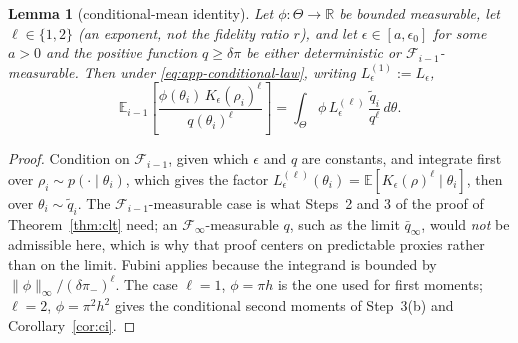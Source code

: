 \documentclass[pdflatex,sn-mathphys-num]{sn-jnl}
\theoremstyle{plain}
\newtheorem{lemma}[theorem]{Lemma}
\theoremstyle{definition}
\begin{document}
\begin{appendices}
\begin{lemma}[conditional-mean identity]\label{lem:condmean}
Let $\phi:\Theta\to\mathbb{R}$ be bounded measurable, let $\ell\in\{1,2\}$ (an exponent, not the fidelity ratio $r$), and let $\epsilon\in[a,\epsilon_0]$ for some $a>0$ and the positive function $q\ge\delta\pi$ be either deterministic or $\mathcal{F}_{i-1}$-measurable. Then under \eqref{eq:app-conditional-law}, writing $L^{(1)}_\epsilon:=L_\epsilon$,
\[
\mathbb{E}_{i-1}\!\left[\frac{\phi(\theta_i)\,K_\epsilon(\rho_i)^{\ell}}{q(\theta_i)^{\ell}}\right]
=\int_\Theta \phi\,L^{(\ell)}_\epsilon\,\frac{\tilde q_i}{q^{\ell}}\,d\theta .
\]
\end{lemma}
\begin{proof}
Condition on $\mathcal{F}_{i-1}$, given which $\epsilon$ and $q$ are constants, and integrate first over $\rho_i\sim p(\cdot\mid\theta_i)$, which gives the factor $L^{(\ell)}_\epsilon(\theta_i)=\mathbb{E}[K_\epsilon(\rho)^\ell\mid\theta_i]$, then over $\theta_i\sim\tilde q_i$. The $\mathcal{F}_{i-1}$-measurable case is what Steps~2 and 3 of the proof of Theorem~\ref{thm:clt} need; an $\mathcal{F}_\infty$-measurable $q$, such as the limit $\bar q_\infty$, would \emph{not} be admissible here, which is why that proof centers on predictable proxies rather than on the limit. Fubini applies because the integrand is bounded by $\|\phi\|_\infty/(\delta\pi_-)^{\ell}$. The case $\ell=1$, $\phi=\pi h$ is the one used for first moments; $\ell=2$, $\phi=\pi^2h^2$ gives the conditional second moments of Step~3(b) and Corollary~\ref{cor:ci}.
\end{proof}


\end{appendices}
\end{document}
